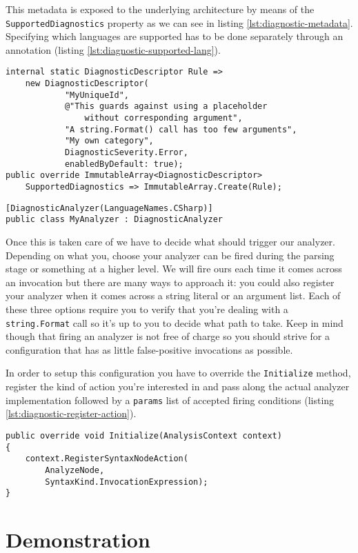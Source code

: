 This metadata is exposed to the underlying architecture by means of the \texttt{SupportedDiagnostics} property as we can see in listing \ref{lst:diagnostic-metadata}. Specifying which languages are supported has to be done separately through an annotation (listing \ref{lst:diagnostic-supported-lang}).

\begin{lstlisting}[label={lst:diagnostic-metadata}]
internal static DiagnosticDescriptor Rule =>
	new DiagnosticDescriptor(
			"MyUniqueId", 
			@"This guards against using a placeholder 
				without corresponding argument", 
			"A string.Format() call has too few arguments", 
			"My own category", 
			DiagnosticSeverity.Error, 
			enabledByDefault: true);
public override ImmutableArray<DiagnosticDescriptor> 
	SupportedDiagnostics => ImmutableArray.Create(Rule);							
\end{lstlisting}

\begin{lstlisting}[label={lst:diagnostic-supported-lang}]
[DiagnosticAnalyzer(LanguageNames.CSharp)]
public class MyAnalyzer : DiagnosticAnalyzer
\end{lstlisting}

Once this is taken care of we have to decide what should trigger our analyzer. Depending on what you, choose your analyzer can be fired during the parsing stage or something at a higher level. We will fire ours each time it comes across an invocation but there are many ways to approach it: you could also register your analyzer when it comes across a string literal or an argument list. Each of these three options require you to verify that you're dealing with a \texttt{string.Format} call so it's up to you to decide what path to take. Keep in mind though that firing an analyzer is not free of charge so you should strive for a configuration that has as little false-positive invocations as possible.

In order to setup this configuration you have to override the \texttt{Initialize} method, register the kind of action you're interested in and pass along the actual analyzer implementation followed by a \texttt{params} list of accepted firing conditions (listing \ref{lst:diagnostic-register-action}).

\begin{lstlisting}[label={lst:diagnostic-register-action}]
public override void Initialize(AnalysisContext context)
{
	context.RegisterSyntaxNodeAction(
		AnalyzeNode, 
		SyntaxKind.InvocationExpression);
}
\end{lstlisting}


\section{Demonstration}
\label{sec:diagnostic-demonstration}



















